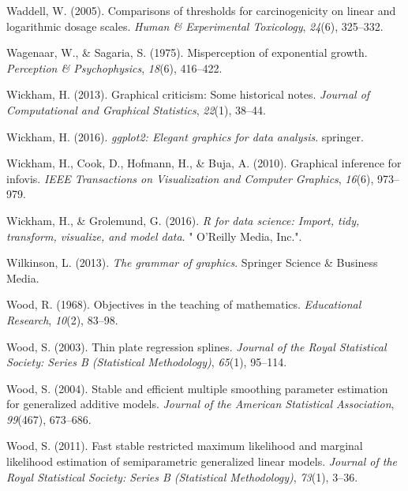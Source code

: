 \documentclass[print]{nuthesis}
\newlength{\cslhangindent}
\newenvironment{CSLReferences}[2]%
{\setlength{\parindent}{0pt}%
\everypar{\setlength{\hangindent}{\cslhangindent}}\ignorespaces}%
{\par}
\begin{document}
\begin{CSLReferences}{1}{0}
\leavevmode{}%
Waddell, W. (2005). Comparisons of thresholds for carcinogenicity on linear and logarithmic dosage scales. \emph{Human \& Experimental Toxicology}, \emph{24}(6), 325--332.

\leavevmode{}%
Wagenaar, W., \& Sagaria, S. (1975). Misperception of exponential growth. \emph{Perception \& Psychophysics}, \emph{18}(6), 416--422.

\leavevmode{}%
Wickham, H. (2013). Graphical criticism: Some historical notes. \emph{Journal of Computational and Graphical Statistics}, \emph{22}(1), 38--44.

\leavevmode{}%
Wickham, H. (2016). \emph{ggplot2: Elegant graphics for data analysis}. springer.

\leavevmode{}%
Wickham, H., Cook, D., Hofmann, H., \& Buja, A. (2010). Graphical inference for infovis. \emph{IEEE Transactions on Visualization and Computer Graphics}, \emph{16}(6), 973--979.

\leavevmode{}%
Wickham, H., \& Grolemund, G. (2016). \emph{R for data science: Import, tidy, transform, visualize, and model data}. " O'Reilly Media, Inc.".

\leavevmode{}%
Wilkinson, L. (2013). \emph{The grammar of graphics}. Springer Science \& Business Media.

\leavevmode{}%
Wood, R. (1968). Objectives in the teaching of mathematics. \emph{Educational Research}, \emph{10}(2), 83--98.

\leavevmode{}%
Wood, S. (2003). Thin plate regression splines. \emph{Journal of the Royal Statistical Society: Series B (Statistical Methodology)}, \emph{65}(1), 95--114.

\leavevmode{}%
Wood, S. (2004). Stable and efficient multiple smoothing parameter estimation for generalized additive models. \emph{Journal of the American Statistical Association}, \emph{99}(467), 673--686.

\leavevmode{}%
Wood, S. (2011). Fast stable restricted maximum likelihood and marginal likelihood estimation of semiparametric generalized linear models. \emph{Journal of the Royal Statistical Society: Series B (Statistical Methodology)}, \emph{73}(1), 3--36.


\end{CSLReferences}
\end{document}
